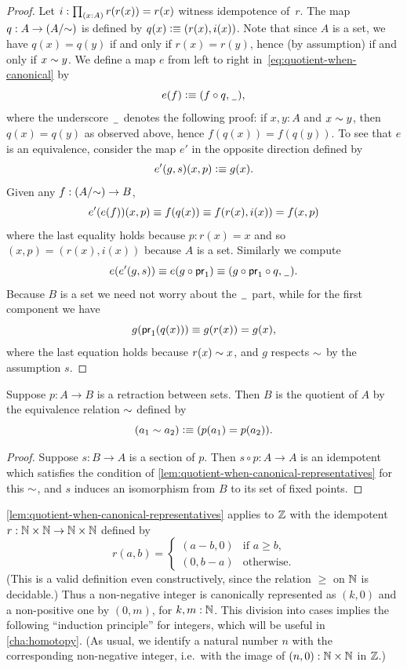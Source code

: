 \begin{proof}
  Let $i : \prd{x : A} r(r(x)) = r(x)$ witness idempotence of~$r$.
  The map $q : A \to (A/{\sim})$ is defined by $q(x) \vcentcolon\equiv (r(x), i(x))$.
  Note that since $A$ is a set, we have $q(x)=q(y)$ if and only if $r(x)=r(y)$, hence (by assumption) if and only if $x \sim y$.
  We define a map $e$ from left to right in~\eqref{eq:quotient-when-canonical} by
  \[ e(f) \vcentcolon\equiv (f \circ q, \mathord{\hspace{1pt}\underline{\hspace{1ex}}\hspace{1pt}}), \]
  where the underscore $\mathord{\hspace{1pt}\underline{\hspace{1ex}}\hspace{1pt}}$ denotes the following proof: if $x, y : A$ and $x \sim y$, then $q(x)=q(y)$ as observed above, hence $f(q(x)) = f(q(y))$.
  To see that $e$ is an equivalence, consider the map $e'$ in the opposite direction defined by
  \[ e'(g, s) (x,p) \vcentcolon\equiv g(x). \]
  Given any $f : (A/{\sim}) \to B$,
  \[ e'(e(f))(x, p) \equiv f(q(x)) \equiv f(r(x), i(x)) = f(x, p) \]
  where the last equality holds because $p : r(x) = x$ and so $(x,p) = (r(x), i(x))$
  because $A$ is a set. Similarly we compute
  \[ e(e'(g, s)) \equiv e(g \circ \mathsf{pr}_{1}) \equiv (g \circ \mathsf{pr}_{1} \circ q, {\mathord{\hspace{1pt}\underline{\hspace{1ex}}\hspace{1pt}}}). \]
  Because $B$ is a set we need not worry about the $\mathord{\hspace{1pt}\underline{\hspace{1ex}}\hspace{1pt}}$ part, while for the first
  component we have
  \[ g(\mathsf{pr}_{1}(q(x))) \equiv g(r(x)) = g(x), \]
  where the last equation holds because $r(x) \sim x$, and $g$ respects $\sim$ by
  the assumption $s$.
\end{proof}

\begin{cor}\label{thm:retraction-quotient}
  Suppose $p:A\to B$ is a retraction between sets.
  Then $B$ is the quotient of $A$ by the equivalence relation $\sim$ defined by
  \[ (a_1 \sim a_2) \vcentcolon\equiv (p(a_1) = p(a_2)). \]
\end{cor}
\begin{proof}
  Suppose $s:B\to A$ is a section of $p$.
  Then $s\circ p : A\to A$ is an idempotent which satisfies the condition of \cref{lem:quotient-when-canonical-representatives} for this $\sim$, and $s$ induces an isomorphism from $B$ to its set of fixed points.
\end{proof}

\begin{rmk}\label{Z-quotient-by-canonical-representatives}
\cref{lem:quotient-when-canonical-representatives} applies to $\mathbb{Z}$ with the idempotent $r : \mathbb{N} \times \mathbb{N} \to \mathbb{N} \times \mathbb{N}$
defined by
%
\begin{equation*}
  r(a, b) =
  \begin{cases}
    (a - b, 0) & \text{if $a \geq b$,} \\
    (0, b - a) & \text{otherwise.}
  \end{cases}
\end{equation*}
%
(This is a valid definition even constructively, since the relation $\geq$ on $\mathbb{N}$ is decidable.)
Thus a non-negative integer is canonically represented as $(k, 0)$ and a non-positive one by $(0, m)$, for $k,m:\mathbb{N}$.
This division into cases implies the following ``induction principle'' for integers, which will be useful in \cref{cha:homotopy}.
%
(As usual, we identify a natural number $n$ with the corresponding non-negative integer, i.e.\ with the image of $(n,0):\mathbb{N}\times\mathbb{N}$ in $\mathbb{Z}$.)
\end{rmk}

